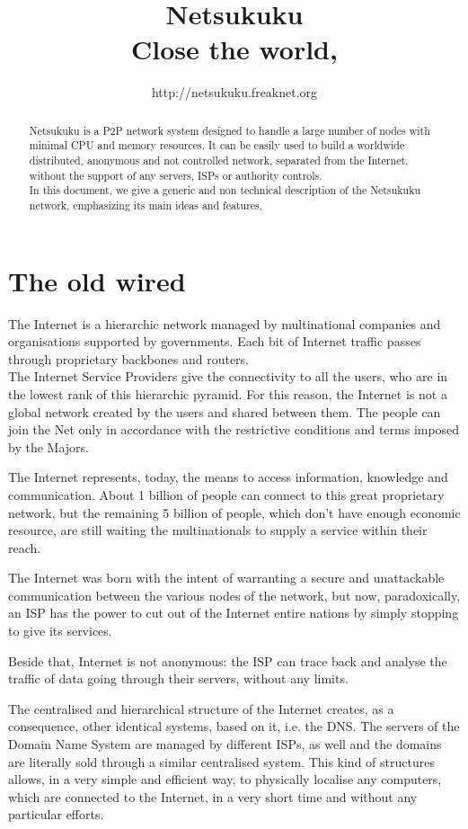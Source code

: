 \documentclass[a4paper]{article}
\title{Netsukuku\\
{\small Close the world, \reflectbox{Open the next}}}
\author{http://netsukuku.freaknet.org}
\begin{document}
\maketitle

\begin{abstract}
Netsukuku is a P2P network system designed to handle a large number of nodes
with minimal CPU and memory resources. It can be easily used to build a
worldwide distributed, anonymous and not controlled network, separated from the
Internet, without the support of any servers, ISPs or authority controls.\\
In this document, we give a generic and non technical description of the
Netsukuku network, emphasizing its main ideas and features.
\end{abstract}


\section{The old wired}

The Internet is a hierarchic network managed by multinational companies and 
organisations supported by governments. Each bit of Internet traffic passes
through proprietary backbones and routers.\\
The Internet Service Providers give the connectivity to all the users, who
are in the lowest rank of this hierarchic pyramid. For this reason, the 
Internet is not a global network created by the users and shared between
them. The people can join the Net only in accordance with the restrictive
conditions and terms imposed by the Majors.

The Internet represents, today, the means to access information, knowledge
and communication. About 1 billion of people can connect to this great
proprietary network, but the remaining 5 billion of people, which don't have
enough economic resource, are still waiting the multinationals to supply a
service within their reach.

The Internet was born with the intent of warranting a secure and
unattackable communication between the various nodes of the network, but
now, paradoxically, an ISP has the power to cut out of the Internet entire
nations by simply stopping to give its services.

Beside that, Internet is not anonymous: the ISP can trace back and analyse
the traffic of data going through their servers, without any limits.

The centralised and hierarchical structure of the Internet creates, as a
consequence, other identical systems, based on it, i.e. the DNS.  
The servers of the Domain Name System are managed by different ISPs, as well
and the domains are literally sold through a similar centralised system.
This kind of structures allows, in a very simple and efficient way, to
physically localise any computers, which are connected to the Internet, in a
very short time and without any particular efforts.
\end{document}
